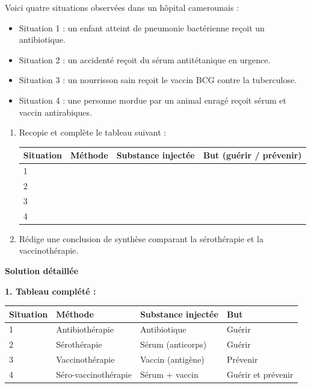 \documentclass[11pt]{article}
\begin{document}
\begin{exoresolu}
Voici quatre situations observées dans un hôpital camerounais :
\begin{itemize}
\item Situation 1 : un enfant atteint de pneumonie bactérienne reçoit un antibiotique.
\item Situation 2 : un accidenté reçoit du sérum antitétanique en urgence.
\item Situation 3 : un nourrisson sain reçoit le vaccin BCG contre la tuberculose.
\item Situation 4 : une personne mordue par un animal enragé reçoit sérum et vaccin antirabiques.
\end{itemize}
\begin{enumerate}
\item Recopie et complète le tableau suivant :

\begin{center}
\begin{tabularx}{\linewidth}{|l|X|X|X|}
\hline
\rowcolor{popblueL} \textbf{Situation} & \textbf{Méthode} & \textbf{Substance injectée} & \textbf{But (guérir / prévenir)} \\
\hline
1 & & & \\
\hline
2 & & & \\
\hline
3 & & & \\
\hline
4 & & & \\
\hline
\end{tabularx}
\end{center}

\item Rédige une conclusion de synthèse comparant la sérothérapie et la vaccinothérapie.
\end{enumerate}
\tcblower
\textbf{Solution détaillée}

\textbf{1. Tableau complété :}

\begin{center}
\begin{tabularx}{\linewidth}{|l|X|X|X|}
\hline
\rowcolor{popblueL} \textbf{Situation} & \textbf{Méthode} & \textbf{Substance injectée} & \textbf{But} \\
\hline
1 & Antibiothérapie & Antibiotique & Guérir \\
\hline
2 & Sérothérapie & Sérum (anticorps) & Guérir \\
\hline
3 & Vaccinothérapie & Vaccin (antigène) & Prévenir \\
\hline
4 & Séro-vaccinothérapie & Sérum + vaccin & Guérir et prévenir \\
\hline
\end{tabularx}
\end{center}


\end{exoresolu}
\end{document}
